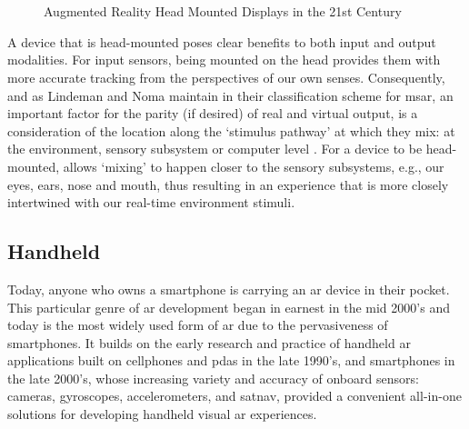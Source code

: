 \begin{figure}
    \centering
    \captionsetup{justification=centering}
    \quad
    \hfill
    \\
    \vspace{0.5cm}
    \quad
    \hfill
    \\
    \caption{Augmented Reality Head Mounted Displays in the 21st Century}
    \label{fig: contemporaryHMDs}
\end{figure}

A device that is head-mounted poses clear benefits to both input and output modalities. For input sensors, being mounted on the head provides them with more accurate tracking from the perspectives of our own senses. Consequently, and as Lindeman and Noma maintain in their classification scheme for \gls{msar}, an important factor for the parity (if desired) of real and virtual output, is a consideration of the location along the `stimulus pathway' at which they mix: at the environment, sensory subsystem or computer level \citeyearpar{lindeman2007}. For a device to be head-mounted, allows `mixing' to happen closer to the sensory subsystems, e.g., our eyes, ears, nose and mouth, thus resulting in an experience that is more closely intertwined with our real-time environment stimuli.

\subsection{Handheld}\label{sec: ar-forms-mobile}
Today, anyone who owns a smartphone is carrying an \gls{ar} device in their pocket. This particular genre of \gls{ar} development began in earnest in the mid 2000's and today is the most widely used form of \gls{ar} due to the pervasiveness of smartphones. It builds on the early research and practice of handheld \gls{ar} applications built on cellphones and \glspl{pda} in the late 1990's, and smartphones in the late 2000's, whose increasing variety and accuracy of onboard sensors: cameras, gyroscopes, accelerometers, and \gls{satnav}, provided a convenient all-in-one solutions for developing handheld visual \gls{ar} experiences. 

